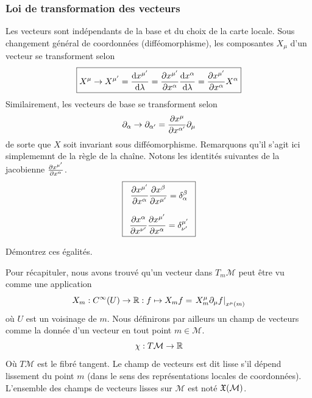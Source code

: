 \subsubsection{Loi de transformation des vecteurs}
Les vecteurs sont indépendants de la base et du choix de la carte locale. Sous changement général de coordonnées (difféomorphisme), les composantes $X_\mu$ d'un vecteur se transforment selon
    \begin{align}
        \boxed{X^\mu \to X^{\mu'} = \frac{\mathrm{d} x^{\mu'}}{\mathrm{d} \lambda} = \frac{\partial x^{\mu'}}{\partial x^\alpha} \frac{\mathrm{d} x^\alpha}{\mathrm{d} \lambda} = \frac{\partial x^{\mu'}}{\partial x^\alpha} X^\alpha}
    \end{align}
Similairement, les vecteurs de base se transforment selon
\begin{equation}
    \partial_\alpha \to \partial_{\alpha'} = \frac{\partial x^\mu}{\partial x^{\alpha'}} \partial_\mu
\end{equation}
de sorte que $X$ soit invariant sous difféomorphisme. Remarquons qu'il s'agit ici simplememnt de la règle de la chaîne. Notons les identités suivantes de la jacobienne $\frac{\partial x^{\mu'}}{\partial x^\alpha}$.
\begin{align}
    \label{eq: id chgmt de coordonnées}
    \boxed{
        \begin{array}{c}
            \displaystyle
            \dfrac{\pd x^{\mu'}}{\pd x^\alpha}\dfrac{\pd x^{\beta}}{\pd x^{\mu'}} = \displaystyle \delta^\beta_\alpha  \\
            \\
            \dfrac{\pd x^{\alpha}}{\pd x^{\nu'}}\dfrac{\pd x^{\mu'}}{\pd x^\alpha} =\displaystyle\delta\indices*{^{\mu'}_{\nu'}}
        \end{array} 
    }
\end{align}
\begin{exerc}
    Démontrez ces égalités.
\end{exerc}
Pour récapituler, nous avons trouvé qu'un vecteur dans $T_m\mathcal{M}$ peut être vu comme une application
\begin{equation}
    X_m:C^\infty(U) \to \mathbb{R}:f \mapsto X_m f = \left. X^\mu_m \partial_\mu f \right|_{x^\mu(m)}
\end{equation}
où $U$ est un voisinage de $m$. Nous définirons par ailleurs un champ de vecteurs comme la donnée d'un vecteur en tout point $m \in \mathcal{M}$.
\begin{equation}
    \chi: T\mathcal{M} \to \mathbb{R}
\end{equation}
Où $T\mathcal{M}$ est le fibré tangent. Le champ de vecteurs est dit lisse s'il dépend lissement du point $m$ (dans le sens des représentations locales de coordonnées). L'ensemble des champs de vecteurs lisses sur $\mathcal{M}$ est noté $ \mathfrak{X} (\mathcal{M})$.


